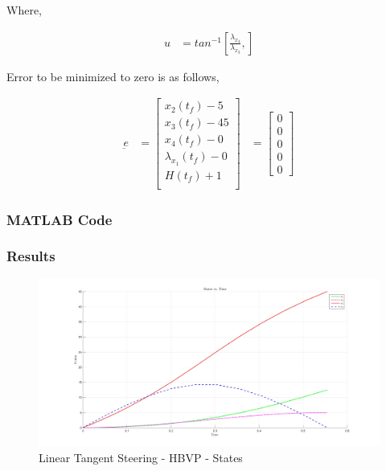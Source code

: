 \documentclass[11pt,usenames]{article}
\begin{document}
	Where,
	
	\begin{align}
	u &= tan^{-1} \left[ \frac{\lambda_{x_{4}}}{\lambda_{x_{3}}} , \right]
	\end{align}
	
	Error to be minimized to zero is as follows,
	
	\begin{align}
	\underbar e &= 
	\begin{bmatrix}
	x_{2}(t_{f})-5 \\ x_{3}(t_{f})-45 \\ x_{4}(t_{f})-0 \\ \lambda_{x_{1}}(t_{f})-0 \\ H(t_{f})+1 \\ 
	\end{bmatrix} 
	&= 
	\begin{bmatrix}
	0 \\ 0 \\ 0 \\ 0 \\ 0
	\end{bmatrix} 
	\end{align}
	
	
	
	\newpage
	
	
	\subsubsection{MATLAB Code}
	
	
	
	\newpage
	
	
	
	\newpage
	
	
	
	\newpage
	
	
	\subsubsection{Results}
	
	\begin{figure}[htpb]
		\centering
		\includegraphics[scale=0.13]{HBVP_LTS_States.jpg}
		\caption{Linear Tangent Steering - HBVP - States}
	\end{figure}
	
\end{document}
